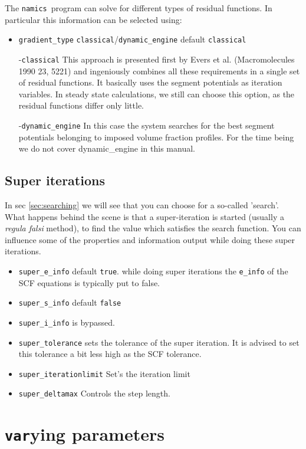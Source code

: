 \documentclass{article}
\newcommand{\namics}{{\tt namics}}
\begin{document}
The \namics\ program can solve for different types of residual functions. In particular this information can be selected using:
\begin{itemize}
\item {\tt gradient\_type} {\tt classical}/{\tt dynamic_engine} default {\tt classical}

-{\tt classical} This approach is presented first by Evers et al. (Macromolecules 1990 23, 5221) and ingeniously combines all these requirements in a single set of residual functions. It basically uses the segment potentials as iteration variables. In steady state calculations, we still can choose this option, as the residual functions differ only little. %

-{\tt dynamic_engine} In this case the system searches for the best segment potentials belonging to imposed volume fraction profiles. For the time being we do not cover dynamic_engine in this manual.
\end{itemize}

\subsection{Super iterations}
In sec \ref{sec:searching} we will see that you can choose for a so-called 'search'. What happens behind the scene is that a super-iteration is started (usually a {\it regula falsi} method), to find the value which satisfies the search function. You can influence some of the properties and information output while doing these super iterations. 

\begin{itemize}
\item {\tt super\_e\_info} default {\tt true}. while doing super iterations the {\tt e\_info} of the SCF equations is typically put to false.
\item {\tt super\_s\_info} default {\tt false}
\item {\tt super\_i\_info} is bypassed. 
\item {\tt super\_tolerance} sets the tolerance of the super iteration. It is advised to set this tolerance a bit less high as the SCF tolerance. 
\item {\tt super\_iterationlimit} Set's the iteration limit
\item {\tt super\_deltamax} Controls the step length. 
\end{itemize}


\section{{\tt var}ying parameters}
\label{sec:varying}
\end{document}
